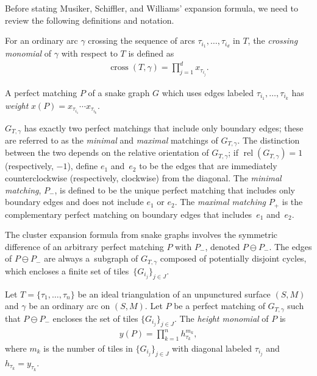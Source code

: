 \documentclass[pdftex]{sigma}%
\numberwithin{equation}{section}
\begin{document}
Before stating Musiker, Schiffler, and Williams' expansion formula, we need to review the following definitions and notation.

\begin{Definition}
For an ordinary arc $\gamma$ crossing the sequence of arcs $\tau_{i_1},\dots,\tau_{i_d}$ in $T$, the \emph{crossing monomial} of $\gamma$ with respect to $T$ is defined as
\begin{gather*}
\operatorname{cross}(T,\gamma) = \prod_{j=1}^d x_{\tau_{i_j}}.
\end{gather*}
\end{Definition}

\begin{Definition}
A perfect matching $P$ of a snake graph $G$ which uses edges labeled $\tau_{i_1}, \dots, \tau_{i_k}$ has \emph{weight} $x(P) = x_{\tau_{i_1}}\cdots x_{\tau_{i_k}}$.
\end{Definition}

\begin{Definition}
$G_{T,\gamma}$ has exactly two perfect matchings that include only boundary edges; these are referred to as the \emph{minimal} and \emph{maximal} matchings of $G_{T,\gamma}$. The distinction between the two depends on the relative orientation of $G_{T,\gamma}$; if $\operatorname{rel}(G_{T,\gamma}) = 1$ (respectively, $-1$), define $e_1$ and~$e_2$ to be the edges that are immediately counterclockwise (respectively, clockwise) from the diagonal. The \emph{minimal matching}, $P_{-}$, is defined to be the unique perfect matching that includes only boundary edges and does not include $e_1$ or $e_2$. The \emph{maximal mat\-ching} $P_{+}$ is the complementary perfect matching on boundary edges that includes~$e_1$ and~$e_2$.
\end{Definition}

The cluster expansion formula from snake graphs involves the symmetric difference of an arbitrary perfect matching $P$ with $P_{-}$, denoted $P \ominus P_{-}$. The edges of $P \ominus P_{-}$ are always a~subgraph of $G_{T,\gamma}$ composed of potentially disjoint cycles, which encloses a finite set of tiles~$\{ G_{i_j} \}_{j \in J}$.

\begin{Definition}
Let $T = \{ \tau_1, \dots, \tau_n \}$ be an ideal triangulation of an unpunctured surface $(S,M)$ and $\gamma$ be an ordinary arc on $(S,M)$. Let $P$ be a perfect matching of $G_{T,\gamma}$ such that $P \ominus P_{-}$ encloses the set of tiles $\{ G_{i_j} \}_{j \in J}$. The \emph{height monomial} of $P$ is
\begin{align*}
y(P) = \prod_{k=1}^n h_{\tau_{k}}^{m_k},
\end{align*}
where $m_k$ is the number of tiles in $\{G_{i_j} \}_{j \in J}$ with diagonal labeled $\tau_{i_j}$ and $h_{\tau_k} = y_{\tau_k}$.
\end{Definition}
\end{document}
